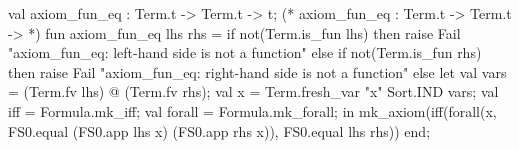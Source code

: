 \nwenddocs{}\plusendmoddef\nwstartdeflinemarkup{}\nwenddeflinemarkup
val axiom_fun_eq : Term.t -> Term.t -> t;
\nwendcode{}\nwdocspar
\nwenddocs{}\plusendmoddef\nwstartdeflinemarkup{}\nwenddeflinemarkup
(* axiom_fun_eq : Term.t -> Term.t ->  *)
fun axiom_fun_eq lhs rhs =
  if not(Term.is_fun lhs)
  then raise Fail "axiom_fun_eq: left-hand side is not a function"
  else if not(Term.is_fun rhs)
  then raise Fail "axiom_fun_eq: right-hand side is not a function"
  else let val vars = (Term.fv lhs) @ (Term.fv rhs);
           val x = Term.fresh_var "x" Sort.IND vars;
           val iff = Formula.mk_iff;
           val forall = Formula.mk_forall;
       in mk_axiom(iff(forall(x, FS0.equal (FS0.app lhs x)
                                           (FS0.app rhs x)),
                       FS0.equal lhs rhs))
       end;
\eatline
